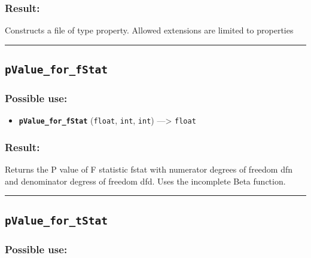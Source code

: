 \documentclass[]{book}
\providecommand{\tightlist}{%
  \setlength{\itemsep}{0pt}\setlength{\parskip}{0pt}}
\theoremstyle{definition}
\theoremstyle{definition}
\theoremstyle{definition}
\theoremstyle{remark}
\begin{document}
\subsubsection{Result:}\label{result-406}

Constructs a file of type property. Allowed extensions are limited to
properties

\begin{center}\rule{0.5\linewidth}{\linethickness}\end{center}

\subsection{\texorpdfstring{\texttt{pValue\_for\_fStat}}{pValue\_for\_fStat}}\label{pvalue_for_fstat}

\subsubsection{Possible use:}\label{possible-use-421}

\begin{itemize}
\tightlist
\item
  \textbf{\texttt{pValue\_for\_fStat}} (\texttt{float}, \texttt{int},
  \texttt{int}) ---\textgreater{} \texttt{float}
\end{itemize}

\subsubsection{Result:}\label{result-407}

Returns the P value of F statistic fstat with numerator degrees of
freedom dfn and denominator degress of freedom dfd. Uses the incomplete
Beta function.

\begin{center}\rule{0.5\linewidth}{\linethickness}\end{center}

\subsection{\texorpdfstring{\texttt{pValue\_for\_tStat}}{pValue\_for\_tStat}}\label{pvalue_for_tstat}

\subsubsection{Possible use:}\label{possible-use-422}
\end{document}
